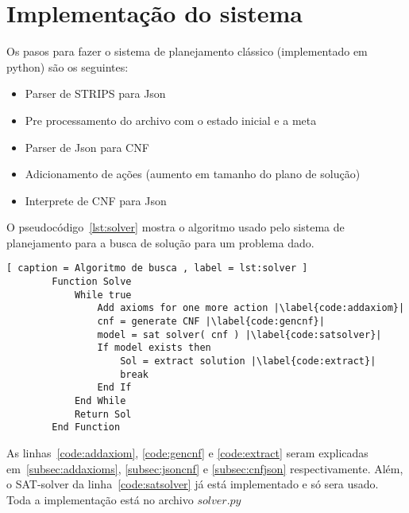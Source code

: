 \section{Implementação do sistema}
\label{sec:implementacao}

Os pasos para fazer o sistema de planejamento clássico (implementado em python) são os seguintes:
	\begin{itemize}
		\item Parser de STRIPS para Json
		\item Pre processamento do archivo com o estado inicial e a meta
		\item Parser de Json para CNF
		\item Adicionamento de ações (aumento em tamanho do plano de solução)
		\item Interprete de CNF para Json
	\end{itemize}
O pseudocódigo~\ref{lst:solver} mostra o algoritmo usado pelo sistema de planejamento para a busca de solução para um problema dado.
	\renewcommand \lstlistingname{Pseudocódigo}
	\begin{lstlisting}[ caption = Algoritmo de busca , label = lst:solver ]
		Function Solve
			While true
				Add axioms for one more action |\label{code:addaxiom}|
				cnf = generate CNF |\label{code:gencnf}|
				model = sat solver( cnf ) |\label{code:satsolver}|
				If model exists then
					Sol = extract solution |\label{code:extract}|
					break
				End If
			End While
			Return Sol
		End Function
	\end{lstlisting}
As linhas~\ref{code:addaxiom}, \ref{code:gencnf} e \ref{code:extract} seram explicadas em~\ref{subsec:addaxioms}, \ref{subsec:jsoncnf} e \ref{subsec:cnfjson} respectivamente. Além, o SAT-solver da linha~\ref{code:satsolver} já está implementado e só sera usado. Toda a implementação está no archivo ${solver.py}$

